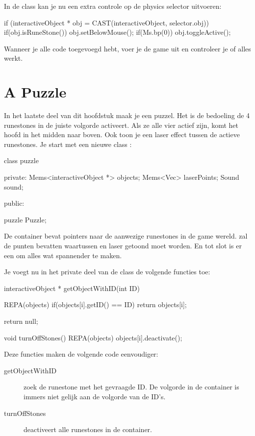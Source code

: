 In de class  kan je nu een extra controle op de physics selector uitvoeren:

\begin{code}
if (interactiveObject  * obj = CAST(interactiveObject, selector.obj))
{
	if(obj.isRuneStone())
	{
	   obj.setBelowMouse();
	   if(Ms.bp(0))
	   {
	      obj.toggleActive();
	   }
	}
}
\end{code}

\begin{exercise}
Wanneer je alle code toegevoegd hebt, voer je de game uit en controleer je of alles werkt.
\end{exercise}


\section{A Puzzle}
In het laatste deel van dit hoofdstuk maak je een puzzel. Het is de bedoeling de 4 runestones in de juiste volgorde activeert. Als ze alle vier actief zijn, komt het hoofd in het midden naar boven. Ook toon je een laser effect tussen de actieve runestones. Je start met een nieuwe class :

\begin{code}
class puzzle {
private:
	Mems<interactiveObject *> objects;
	Mems<Vec> laserPoints;
	Sound sound;

public:

}
puzzle Puzzle;
\end{code}

De  container bevat pointers naar de aanwezige runestones in de game wereld.  zal de punten bevatten waartussen en laser getoond moet worden. En tot slot is er een  om alles wat spannender te maken.

Je voegt nu in het private deel van de class de volgende functies toe:

\begin{code}
interactiveObject * getObjectWithID(int ID)
{
  REPA(objects)
  {
     if(objects[i].getID() == ID) return objects[i];
  }
  
  return null;
}

void turnOffStones()
{
  REPA(objects) objects[i].deactivate();
}
\end{code}

Deze functies maken de volgende code eenvoudiger:

\begin{description}
	\item[getObjectWithID] zoek de runestone met het gevraagde ID. De volgorde in de container is immers niet gelijk aan de volgorde van de ID's.
	\item[turnOffStones] deactiveert alle runestones in de container.
\end{description}

